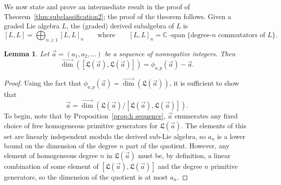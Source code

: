 \documentclass[11pt]{amsart}
\newtheorem{lemma}[theorem]{Lemma}
\theoremstyle{definition}
\numberwithin{equation}{section}
\def\CC{{\mathbb C}}
\begin{document}
We now state and prove an intermediate result in the proof of Theorem~\ref{thm:subclassification2}; the proof of the theorem follows.  Given a graded Lie algebra $L$, the (graded) derived subalgebra of $L$ is 
\[
[L, L] = \bigoplus_{n \ge 1} [L, L]_{n}
\qquad\text{where}\qquad
[L, L]_{n} = \CC\operatorname{-span}\{\text{degree-$n$ commutators of $L$}\}.
\]

\begin{lemma}
\label{lem:deriveddimension}
Let $\vec{a} = (a_{1}, a_{2}, \ldots)$ be a sequence of nonnegative integers.  Then
\[
\vec{\dim}([\mathfrak{L}(\vec{a}), \mathfrak{L}(\vec{a})]) = \phi_{a, p}(\vec{a}) - \vec{a}.
\]
\end{lemma}
\begin{proof}
Using the fact that $\phi_{a, p}(\vec{a}) = \vec{\dim}(\mathfrak{L}(\vec{a}))$, it is sufficient to show that
\[
\vec{a} = \vec{\dim}\left( \mathfrak{L}(\vec{a}) \big/ [\mathfrak{L}(\vec{a}), \mathfrak{L}(\vec{a})] \right).
\]
To begin, note that by Proposition~\ref{prop:h sequence}, $\vec{a}$ enumerates any fixed choice of free homogeneous primitive generators for $\mathfrak{L}(\vec{a})$.  
The elements of this set are linearly independent modulo the derived sub-Lie algebra, so $a_{n}$ is a lower bound on the dimension of the degree $n$ part of the quotient.  
However, any element of homogeneous degree $n$ in $\mathfrak{L}(\vec{a})$ must be, by definition, a linear combination of some element of $[\mathfrak{L}(\vec{a}), \mathfrak{L}(\vec{a})]$ and the degree $n$ primitive generators, so the dimension of the quotient is at most $a_{n}$.
\end{proof}
\end{document}
